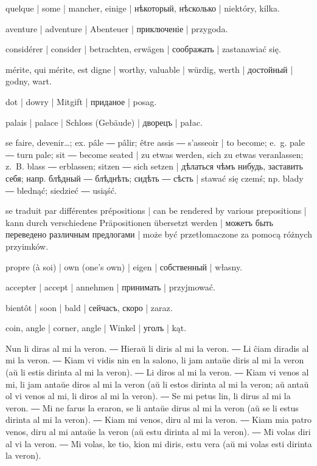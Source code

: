 \begin{ekzvocab}{1em}
 quelque | some | mancher, einige | нѣкоторый, нѣсколько | niektóry, kilka.

 aventure | adventure | Abenteuer | приключеніе | przygoda.

 considérer | consider | betrachten, erwägen | соображать | zastanawiać się.

 mérite, qui mérite, est digne | worthy, valuable | würdig, werth | достойный | godny, wart.

 dot | dowry | Mitgift | приданое | posag.

 palais | palace | Schloss (Gebäude) | дворецъ | pałac.

 se faire, devenir\ldots{}; ex.  pâle ―  pâlir;  être assis ―  s’asseoir | to become; e.~g.  pale ―  turn pale;  sit ―  become seated | zu etwas werden, sich zu etwas veranlassen; z.~B.  blass ―  erblassen;  sitzen ―  sich setzen | дѣлаться чѣмъ нибудь, заставить себя; напр.  блѣдный ―  блѣднѣть;  сидѣть ―  сѣсть | stawać się czemś; np.  blady ―  blednąć;  siedzieć ―  usiąść.

 se traduit par différentes prépositions | can be rendered by various prepositions | kann durch verschiedene Präpositionen übersetzt werden | можетъ быть переведено различным предлогами | może być przetłomaczone za pomocą różnych przyimków.

 propre (à soi) | own (one’s own) | eigen | собственный | własny.

 accepter | accept | annehmen | принимать | przyjmować.

 bientôt | soon | bald | сейчасъ, скоро | zaraz.

 coin, angle | corner, angle | Winkel | уголъ | kąt.

\end{ekzvocab}



Nun li diras al mi la veron. ― Hieraŭ li diris al mi la veron. ― Li ĉiam diradis al mi la veron. ― Kiam vi vidis nin en la salono, li jam antaŭe diris al mi la veron (aŭ li estis dirinta al mi la veron). ― Li diros al mi la veron. ― Kiam vi venos al mi, li jam antaŭe diros al mi la veron (aŭ li estos dirinta al mi la veron; aŭ antaŭ ol vi venos al mi, li diros al mi la veron). ― Se mi petus lin, li dirus al mi la veron. ― Mi ne farus la eraron, se li antaŭe dirus al mi la veron (aŭ se li estus dirinta al mi la veron). ― Kiam mi venos, diru al mi la veron. ― Kiam mia patro venos, diru al mi antaŭe la veron (aŭ estu dirinta al mi la veron). ― Mi volas diri al vi la veron. ― Mi volas, ke tio, kion mi diris, estu vera (aŭ mi volas esti dirinta la veron).


